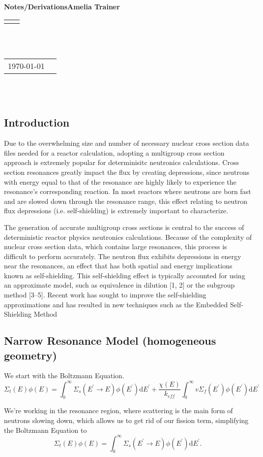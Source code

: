 \documentclass[10pt]{article}
\renewcommand{\title}[1]{\textbf{#1}\\}
\renewcommand{\line}{\begin{tabularx}{\textwidth}{X>{\raggedleft}X}\hline\\\end{tabularx}\\[-0.5cm]}
\newcommand{\leftright}[2]{\begin{tabularx}{\textwidth}{X>{\raggedleft}X}#1%
\end{tabularx}\\[-0.5cm]}
\begin{document}
\title{Notes/Derivations\qquad Amelia Trainer }
\line\\
\leftright{\today}{ }%
~\par

\subsection*{Introduction}
Due to the overwhelming size and number of necessary nuclear cross section data files needed for a reactor calculation, adopting a multigroup cross section approach is extremely popular for determinisitc neutronics calculations. Cross section resonances greatly impact the flux by creating depressions, since neutrons with energy equal to that of the resonance are highly likely to experience the resonance's corresponding reaction. In most reactors where neutrons are born fast and are slowed down through the resonance range, this effect relating to neutron flux depressions (i.e. self-shielding) is extremely important to characterize.

The generation of accurate multigroup cross sections is central to the success of deterministic reactor physics neutronics calculations. Because of the complexity of nuclear cross section data, which contains large resonances, this process is difficult to perform accurately. The neutron flux exhibits depressions in energy near the resonances, an effect that has both spatial and energy implications known as self-shielding. This self-shielding effect is typically accounted for using an approximate model, such as equivalence in dilution [1, 2] or the subgroup method [3–5]. Recent work has sought to improve the self-shielding approximations and has resulted in new techniques such as the Embedded Self-Shielding Method 



\subsection*{Narrow Resonance Model (homogeneous geometry)}
We start with the Boltzmann Equation.
\begin{equation}\Sigma_{t}(E)\phi(E)=\int_{0}^{\infty}\Sigma_{s}\left(E^{\prime}\rightarrow E\right)\phi\left(E^{\prime}\right)\mathrm{d}E^{\prime}+\frac{\chi(E)}{k_{eff}}\int_{0}^{\infty}v\Sigma_{f}\left(E^{\prime}\right)\phi\left(E^{\prime}\right)\mathrm{d}E^{\prime}\end{equation}

We're working in the resonance region, where scattering is the main form of neutrons slowing down, which allows us to get rid of our fission term, simplifying the Boltzmann Equation to
\begin{equation}\Sigma_{t}(E)\phi(E)=\int_{0}^{\infty}\Sigma_{s}\left(E^{\prime}\rightarrow E\right)\phi\left(E^{\prime}\right)\mathrm{d}E^{\prime}.\end{equation}
\end{document}
